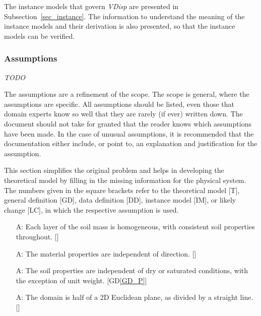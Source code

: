 \documentclass[12pt]{article}
\newcommand{\dref}[1]{GD\ref{#1}}
\newcounter{assumpnum} %
\begin{document}
\begin{figure}[H]
\end{figure}

The instance models that govern \emph{VDisp}{} are presented in
Subsection~\ref{sec_instance}.  The information to understand the meaning of the
instance models and their derivation is also presented, so that the instance
models can be verified.

\subsubsection{Assumptions} \label{sec_assumpt}

\emph{TODO}

The assumptions are a refinement of the scope.  The scope is general, where the
assumptions are specific.  All assumptions should be listed, even those that
domain experts know so well that they are rarely (if ever) written down. The
document should not take for granted that the reader knows which assumptions
have been made. In the case of unusual assumptions, it is recommended that the
documentation either include, or point to, an explanation and justification for
the assumption.

This section simplifies the original problem and helps in developing the
theoretical model by filling in the missing information for the physical
system. The numbers given in the square brackets refer to the theoretical model
[T], general definition [GD], data definition [DD], instance model [IM], or
likely change [LC], in which the respective assumption is used.

\begin{enumerate}[label=A\arabic*:,ref={\arabic*}]
  
  \item [A\refstepcounter{assumpnum}\theassumpnum: \label{A_Homo}] Each layer of
  the soil mass is homogeneous, with consistent soil properties throughout.
  []

  \item [A\refstepcounter{assumpnum}\theassumpnum: \label{A_Isotropic}] The material properties are independent of direction.
  []

  \item [A\refstepcounter{assumpnum}\theassumpnum: \label{A_Saturated}] The soil 
  properties are independent of dry or saturated conditions, with the exception 
  of unit weight. [\dref{GD_P}]
          
  \item [A\refstepcounter{assumpnum}\theassumpnum: \label{A_HalfPlane}] The
    domain is half of a 2D Euclidean plane, as divided by a straight line. []
    
\end{enumerate}
  
\end{document}
